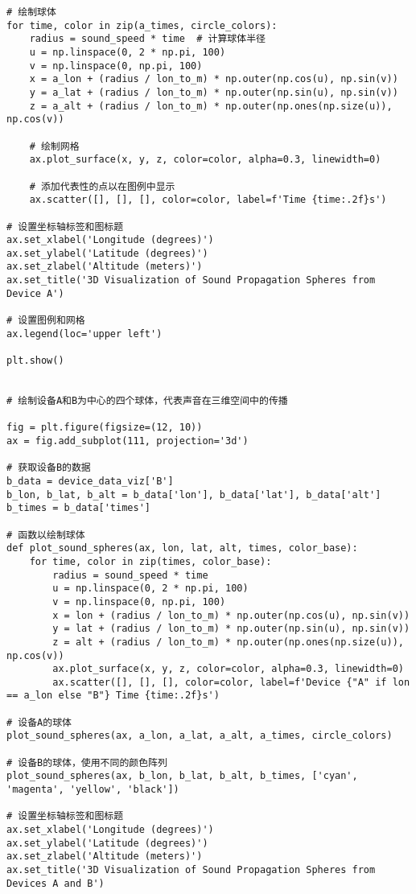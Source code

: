 \documentclass[withoutpreface,bwprint,12pt,a4paper]{cumcmthesis}
\begin{document}
\begin{appendices}
\begin{lstlisting}
# 绘制球体
for time, color in zip(a_times, circle_colors):
    radius = sound_speed * time  # 计算球体半径
    u = np.linspace(0, 2 * np.pi, 100)
    v = np.linspace(0, np.pi, 100)
    x = a_lon + (radius / lon_to_m) * np.outer(np.cos(u), np.sin(v))
    y = a_lat + (radius / lon_to_m) * np.outer(np.sin(u), np.sin(v))
    z = a_alt + (radius / lon_to_m) * np.outer(np.ones(np.size(u)), np.cos(v))

    # 绘制网格
    ax.plot_surface(x, y, z, color=color, alpha=0.3, linewidth=0)

    # 添加代表性的点以在图例中显示
    ax.scatter([], [], [], color=color, label=f'Time {time:.2f}s')

# 设置坐标轴标签和图标题
ax.set_xlabel('Longitude (degrees)')
ax.set_ylabel('Latitude (degrees)')
ax.set_zlabel('Altitude (meters)')
ax.set_title('3D Visualization of Sound Propagation Spheres from Device A')

# 设置图例和网格
ax.legend(loc='upper left')

plt.show()


# 绘制设备A和B为中心的四个球体，代表声音在三维空间中的传播

fig = plt.figure(figsize=(12, 10))
ax = fig.add_subplot(111, projection='3d')

# 获取设备B的数据
b_data = device_data_viz['B']
b_lon, b_lat, b_alt = b_data['lon'], b_data['lat'], b_data['alt']
b_times = b_data['times']

# 函数以绘制球体
def plot_sound_spheres(ax, lon, lat, alt, times, color_base):
    for time, color in zip(times, color_base):
        radius = sound_speed * time
        u = np.linspace(0, 2 * np.pi, 100)
        v = np.linspace(0, np.pi, 100)
        x = lon + (radius / lon_to_m) * np.outer(np.cos(u), np.sin(v))
        y = lat + (radius / lon_to_m) * np.outer(np.sin(u), np.sin(v))
        z = alt + (radius / lon_to_m) * np.outer(np.ones(np.size(u)), np.cos(v))
        ax.plot_surface(x, y, z, color=color, alpha=0.3, linewidth=0)
        ax.scatter([], [], [], color=color, label=f'Device {"A" if lon == a_lon else "B"} Time {time:.2f}s')

# 设备A的球体
plot_sound_spheres(ax, a_lon, a_lat, a_alt, a_times, circle_colors)

# 设备B的球体，使用不同的颜色阵列
plot_sound_spheres(ax, b_lon, b_lat, b_alt, b_times, ['cyan', 'magenta', 'yellow', 'black'])

# 设置坐标轴标签和图标题
ax.set_xlabel('Longitude (degrees)')
ax.set_ylabel('Latitude (degrees)')
ax.set_zlabel('Altitude (meters)')
ax.set_title('3D Visualization of Sound Propagation Spheres from Devices A and B')


\end{lstlisting}
\end{appendices}
\end{document}

